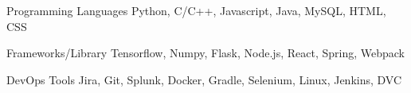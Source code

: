 

\begin{cvskills}


\cvskill
{Programming Languages} %
{Python, C/C++, Javascript, Java, MySQL, HTML, CSS} %

\cvskill
  {Frameworks/Library} %
  {Tensorflow, Numpy, Flask, Node.js, React, Spring, Webpack} %
  
\cvskill
{DevOps Tools}
{Jira, Git, Splunk, Docker, Gradle, Selenium, Linux, Jenkins, DVC}

\end{cvskills}
